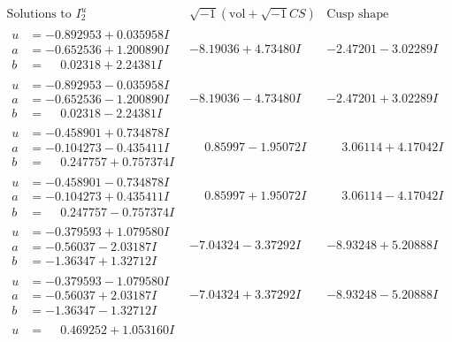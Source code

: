 \documentclass[1p]{elsarticle_modified}
\theoremstyle{definition}
\newcommand{\I}{\sqrt{-1}}
\begin{document}
$$\begin{array}{c|c|c}  
\text{Solutions to }I^u_{2}& \I (\text{vol} + \sqrt{-1}CS) & \text{Cusp shape}\\
 \hline 
\begin{aligned}
u &= -0.892953 + 0.035958 I \\
a &= -0.652536 + 1.200890 I \\
b &= \phantom{-}0.02318 + 2.24381 I\end{aligned}
 & -8.19036 + 4.73480 I & -2.47201 - 3.02289 I \\ \hline\begin{aligned}
u &= -0.892953 - 0.035958 I \\
a &= -0.652536 - 1.200890 I \\
b &= \phantom{-}0.02318 - 2.24381 I\end{aligned}
 & -8.19036 - 4.73480 I & -2.47201 + 3.02289 I \\ \hline\begin{aligned}
u &= -0.458901 + 0.734878 I \\
a &= -0.104273 - 0.435411 I \\
b &= \phantom{-}0.247757 + 0.757374 I\end{aligned}
 & \phantom{-}0.85997 - 1.95072 I & \phantom{-}3.06114 + 4.17042 I \\ \hline\begin{aligned}
u &= -0.458901 - 0.734878 I \\
a &= -0.104273 + 0.435411 I \\
b &= \phantom{-}0.247757 - 0.757374 I\end{aligned}
 & \phantom{-}0.85997 + 1.95072 I & \phantom{-}3.06114 - 4.17042 I \\ \hline\begin{aligned}
u &= -0.379593 + 1.079580 I \\
a &= -0.56037 - 2.03187 I \\
b &= -1.36347 + 1.32712 I\end{aligned}
 & -7.04324 - 3.37292 I & -8.93248 + 5.20888 I \\ \hline\begin{aligned}
u &= -0.379593 - 1.079580 I \\
a &= -0.56037 + 2.03187 I \\
b &= -1.36347 - 1.32712 I\end{aligned}
 & -7.04324 + 3.37292 I & -8.93248 - 5.20888 I \\ \hline\begin{aligned}
u &= \phantom{-}0.469252 + 1.053160 I \\

\end{aligned}
\end{array}$$
\end{document}
